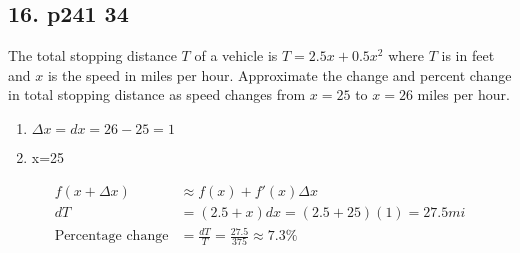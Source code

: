 \documentclass[11pt]{article}
\begin{document}
\subsection{16. p241 34}
The total stopping distance $T$ of a vehicle is $T=2.5x+0.5x^2$ where $T$ is in feet and $x$ is the speed in miles per hour. Approximate the change and percent change in total stopping distance as speed changes from $x=25$ to $x=26$ miles per hour.
\begin{enumerate}
    \item $\Delta x=dx=26-25=1$
    \item x=25
\end{enumerate}
\begin{align}
    f(x+\Delta x)&\approx f(x)+f'(x)\Delta x\\
    dT&=(2.5+x)dx=(2.5+25)(1)=27.5mi\\
    \text{Percentage change}&=\frac{dT}{T}=\frac{27.5}{375}\approx 7.3\%
\end{align}
\end{document}
